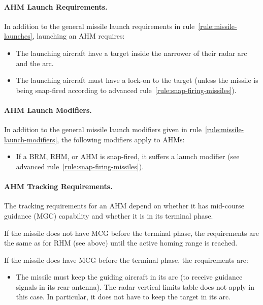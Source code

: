 {\paragraph{AHM Launch Requirements.}\label{rule:ahm-launch-requirements} In addition to the general missile launch requirements in rule~\ref{rule:missile-launches}, launching an AHM requires:

\begin{itemize}

    \item The launching aircraft have a target inside the narrower of their radar arc and the  arc.

    \item The launching aircraft must have a lock-on to the target (unless the missile is being snap-fired according to advanced rule~\ref{rule:snap-firing-missiles}).

\end{itemize}

\paragraph{AHM Launch Modifiers.}
\label{rule:ahm-launch-modifiers}

In addition to the general missile launch modifiers given in rule~\ref{rule:missile-launch-modifiers}, the following modifiers apply to AHMs:

\begin{itemize}
    \item If a BRM, RHM, or AHM is snap-fired, it suffers a  launch modifier (see advanced rule~\ref{rule:snap-firing-missiles}).
\end{itemize}

\paragraph{AHM Tracking Requirements.} The tracking requirements for an AHM depend on whether it has mid-course guidance (MGC) capability and whether it is in its terminal phase.

If the missile does not have MCG before the terminal phase, the requirements are the same as for RHM (see above) until the active homing range is reached.


If the missile does have MCG before the terminal phase, the requirements are:
\begin{itemize}
    \item The missile must keep the guiding aircraft in its  arc (to receive guidance signals in its rear antenna). The radar vertical limits table does not apply in this case. In particular, it does not have to keep the target in its  arc.
\end{itemize}

}
